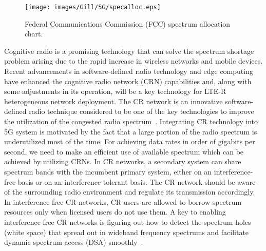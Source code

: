 \begin{figure}[!ht]
	\centering
\texttt{[image: images/Gill/5G/specalloc.eps]}
	\caption{Federal Communications Commission (FCC) spectrum allocation chart.}
	\label{specalloc}
\end{figure}

Cognitive radio is a promising technology that can solve the spectrum shortage problem arising due to the rapid increase in wireless networks and mobile devices. Recent advancements in software-defined radio technology and edge computing have enhanced the cognitive radio network (CRN)  capabilities and, along with some adjustments in its operation, will be a key technology for LTE-R heterogeneous network deployment.  The CR network is an innovative software-defined radio technique considered to be one of the key technologies to improve the utilization of the congested radio spectrum~\cite{rusek2013scaling}. Integrating CR technology into 5G system is motivated by the fact that a large portion of the radio spectrum is underutilized most of the time. For achieving data rates in order of gigabits per second, we need to make an efficient use of available spectrum which can be achieved by utilizing CRNs. In CR networks, a secondary system can share spectrum bands with the incumbent primary system, either on an interference-free basis or on an interference-tolerant basis. The CR network should be aware of
the surrounding radio environment and regulate its transmission accordingly. In interference-free CR networks, CR users are allowed to borrow spectrum resources only when licensed users do
not use them. A key to enabling interference-free CR networks is figuring out how to detect the spectrum holes (white space) that spread out in wideband frequency spectrums and facilitate dynamic spectrum access (DSA) smoothly~\cite{wyglinski2009cognitive}. 

